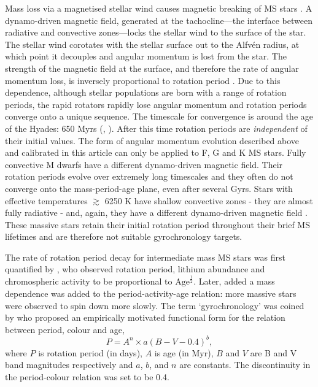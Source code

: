 \documentclass[10pt,preprint]{aastex}
\begin{document}
Mass loss via a magnetised stellar wind causes magnetic breaking of MS stars \citep{Weber1967}.
A dynamo-driven magnetic field, generated at the tachocline---the interface between radiative and convective zones---locks the stellar wind to the surface of the star.
The stellar wind corotates with the stellar surface out to the Alfv\'{e}n radius, at which point it decouples and angular momentum is lost from the star.
The strength of the magnetic field at the surface, and therefore the rate of angular momentum loss, is inversely proportional to rotation period \citep{Kawaler1988}.
Due to this dependence, although stellar populations are born with a range of rotation periods, the rapid rotators rapidly lose angular momentum and rotation periods converge onto a unique sequence.
The timescale for convergence is around the age of the Hyades: 650 Myrs (\citealt{Radick1987}, \citealt{Irwin2009}).
After this time rotation periods are \emph{independent} of their initial values.
The form of angular momentum evolution described above and calibrated in this article can only be applied to F, G and K MS stars.
Fully convective M dwarfs have a different dynamo-driven magnetic field.
Their rotation periods evolve over extremely long timescales and they often do not converge onto the mass-period-age plane, even after several Gyrs.
Stars with effective temperatures $\gtrsim$ 6250 K have shallow convective zones - they are almost fully radiative - and, again, they have a different dynamo-driven magnetic field \citep{Kraft1967}.
These massive stars retain their initial rotation period throughout their brief MS lifetimes and are therefore not suitable gyrochronology targets.

The rate of rotation period decay for intermediate mass MS stars was first quantified by \citet{Skumanich1972}, who observed rotation period, lithium abundance and chromospheric activity to be proportional to $\mathrm{Age}^{\frac{1}{2}}$.
Later, \citet{Noyes1984_2} added a mass dependence was added to the period-activity-age relation: more massive stars were observed to spin down more slowly.
The term `gyrochronology' was coined by \citet{Barnes2003} who proposed an empirically motivated functional form for the relation between period, colour and age,
\begin{equation}
P = A^n \times a(B-V-0.4)^b,
\label{eq:Barnes2007_2}
\end{equation}
where $P$ is rotation period (in days), $A$ is age (in Myr), $B$ and $V$ are B and V band magnitudes respectively and $a$, $b$, and $n$ are constants.
The discontinuity in the period-colour relation was set to be 0.4.
\end{document}
